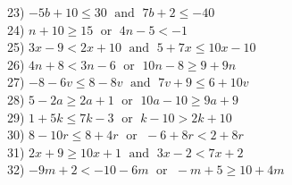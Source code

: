 \documentclass[12pt]{book}
\theoremstyle{definition}
\newcommand{\tmop}[1]{\ensuremath{\operatorname{#1}}}
\begin{document}
  23) $- 5 b + 10 \leq 30 \tmop{~and~} 7 b + 2 \leq - 40$\\
  24) $n + 10 \geq 15 \tmop{~or~} 4 n - 5 < - 1$\\
	25) $3 x - 9 < 2 x + 10 \tmop{~and~} 5 + 7 x \leq 10 x - 10$\\
  26) $4 n + 8 < 3 n - 6 \tmop{~or~} 10 n - 8 \geq 9 + 9 n$\\
  27) $- 8 - 6 v \leq 8 - 8 v \tmop{~and~} 7 v + 9 \leq 6 + 10 v$\\
  28) $5 - 2 a \geq 2 a + 1 \tmop{~or~} 10 a - 10 \geq 9 a + 9$\\
  29) $1 + 5 k \leq 7 k - 3 \tmop{~or~} k - 10 > 2 k + 10$\\
  30) $8 - 10 r \leq 8 + 4 r \tmop{~or~} - 6 + 8 r < 2 + 8 r$\\
  31) $2 x + 9 \geq 10 x + 1 \tmop{~and~} 3 x - 2 < 7 x + 2$\\
  32) $- 9 m + 2 < - 10 - 6 m \tmop{~or~} - m + 5 \geq 10 + 4 m$
\end{document}
